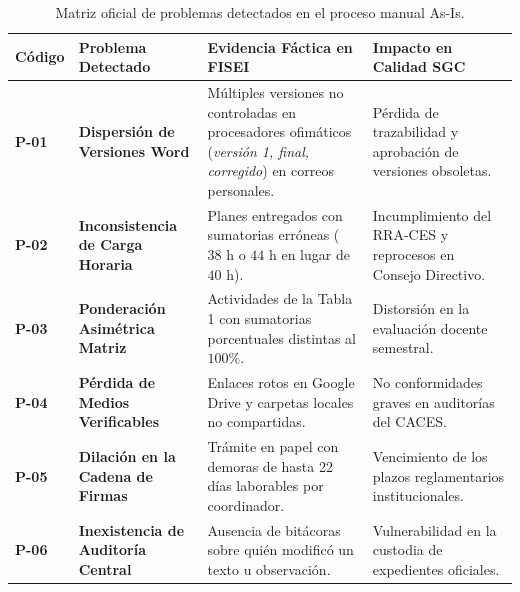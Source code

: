 \documentclass[12pt,a4paper]{article}
\begin{document}
\begin{table}[H]
\centering
\small
\renewcommand{\arraystretch}{1.2}
\begin{tabularx}{\textwidth}{|>{\hsize=0.3\hsize\centering\arraybackslash\footnotesize}X|>{\hsize=1.0\hsize\raggedright\arraybackslash\bfseries\footnotesize}X|>{\hsize=1.35\hsize\raggedright\arraybackslash\footnotesize}X|>{\hsize=1.35\hsize\raggedright\arraybackslash\footnotesize}X|}
\hline
\rowcolor{tableheader}
\textbf{Código} & \textbf{Problema Detectado} & \textbf{Evidencia Fáctica en FISEI} & \textbf{Impacto en Calidad SGC} \\
\hline
\textbf{P-01} & Dispersión de Versiones Word & Múltiples versiones no controladas en procesadores ofimáticos (\textit{versión 1, final, corregido}) en correos personales. & Pérdida de trazabilidad y aprobación de versiones obsoletas. \\
\hline
\textbf{P-02} & Inconsistencia de Carga Horaria & Planes entregados con sumatorias erróneas ($38\text{ h}$ o $44\text{ h}$ en lugar de $40\text{ h}$). & Incumplimiento del RRA-CES y reprocesos en Consejo Directivo. \\
\hline
\textbf{P-03} & Ponderación Asimétrica Matriz & Actividades de la Tabla 1 con sumatorias porcentuales distintas al $100\%$. & Distorsión en la evaluación docente semestral. \\
\hline
\textbf{P-04} & Pérdida de Medios Verificables & Enlaces rotos en Google Drive y carpetas locales no compartidas. & No conformidades graves en auditorías del CACES. \\
\hline
\textbf{P-05} & Dilación en la Cadena de Firmas & Trámite en papel con demoras de hasta 22 días laborables por coordinador. & Vencimiento de los plazos reglamentarios institucionales. \\
\hline
\textbf{P-06} & Inexistencia de Auditoría Central & Ausencia de bitácoras sobre quién modificó un texto u observación. & Vulnerabilidad en la custodia de expedientes oficiales. \\
\hline
\end{tabularx}
\caption{Matriz oficial de problemas detectados en el proceso manual As-Is.}
\label{tab:problemas_as_is}
\end{table}
\end{document}
